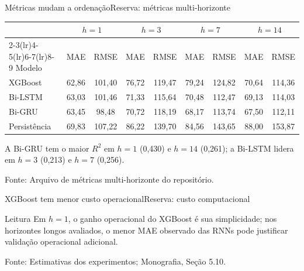 \documentclass[10pt]{beamer}
\newcommand{\source}[1]{%
  \par\vfill{\raggedleft\tiny\color{gray}Fonte: #1\par}%
}
\begin{document}
\begin{frame}[noframenumbering]{Métricas mudam a ordenação}{Reserva: métricas multi-horizonte}
  \centering
  \scriptsize
  \begin{tabular}{l cc cc cc cc}
    \toprule
     & \multicolumn{2}{c}{$h=1$} & \multicolumn{2}{c}{$h=3$} &
       \multicolumn{2}{c}{$h=7$} & \multicolumn{2}{c}{$h=14$} \\
    \cmidrule(lr){2-3}\cmidrule(lr){4-5}\cmidrule(lr){6-7}\cmidrule(lr){8-9}
    Modelo & MAE & RMSE & MAE & RMSE & MAE & RMSE & MAE & RMSE \\
    \midrule
    XGBoost & 62,86 & 101,40 & 76,72 & 119,47 & 79,24 & 124,82 & 70,64 & 114,36 \\
    Bi-LSTM & 63,03 & 101,46 & 71,33 & 115,64 & 70,48 & 112,47 & 69,13 & 114,03 \\
    Bi-GRU  & 63,45 & 98,48 & 70,72 & 118,19 & 68,17 & 113,74 & 67,50 & 112,11 \\
    Persistência & 69,83 & 107,22 & 86,22 & 139,70 & 84,56 & 143,65 & 88,00 & 153,87 \\
    \bottomrule
  \end{tabular}

  \vspace{1em}
  \normalsize
  A Bi-GRU tem o maior $R^2$ em $h=1$ (0,430) e $h=14$ (0,261); a Bi-LSTM lidera em $h=3$ (0,213) e $h=7$ (0,256).

  \source{Arquivo de métricas multi-horizonte do repositório.}
\end{frame}

\begin{frame}[noframenumbering]{XGBoost tem menor custo operacional}{Reserva: custo computacional}
  \centering

  \vspace{1em}
  \begin{block}{Leitura}
    Em $h=1$, o ganho operacional do XGBoost é sua simplicidade; nos horizontes longos avaliados, o menor MAE observado das RNNs pode justificar validação operacional adicional.
  \end{block}

  \source{Estimativas dos experimentos; Monografia, Seção 5.10.}
\end{frame}
\end{document}
